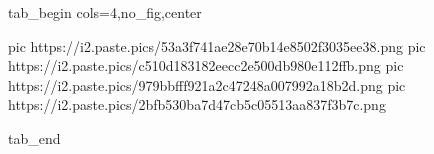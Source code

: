  
 
 
 
 

\ifcmt
  tab_begin cols=4,no_fig,center

     pic https://i2.paste.pics/53a3f741ae28e70b14e8502f3035ee38.png
		 pic https://i2.paste.pics/c510d183182eecc2e500db980e112ffb.png
		 pic https://i2.paste.pics/979bbfff921a2c47248a007992a18b2d.png
		 pic https://i2.paste.pics/2bfb530ba7d47cb5c05513aa837f3b7c.png

  tab_end
\fi
